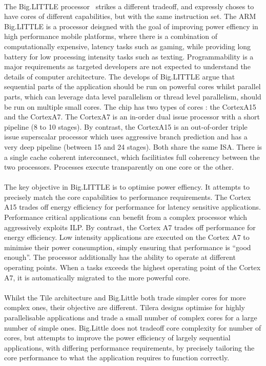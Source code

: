\paragraph{} The Big.LITTLE processor~\cite{greenhalgh2011biglittle} strikes 
a different tradeoff, and expressly choses to have cores of different capabilities, but
with the same instruction set. The ARM Big.LITTLE is a processor
deisgned with the goal of improving power effiency in high
performance mobile platforms, where there is a combination
of computationally expensive, latency tasks such as gaming, 
while providing long battery for low processing intensity tasks such
as texting. Programmability is a major requirements as targeted developers
are not expected to understand the details of computer architecture. 
The develops of Big.LITTLE argue that sequential parts of the application 
should be run on powerful cores whilst parallel parts, which can leverage data
level parallelism or thread level parallelism, should be run
on multiple small cores. The chip has two types of cores
: the CortexA15 and the CortexA7. The CortexA7 is an in-order dual issue
processor with a short pipeline (8 to 10 stages). By contrast,  the CortexA15
 is an out-of-order triple issue superscalar processor
which uses aggressive branch prediction and has a very deep pipeline
(between 15 and 24 stages). Both share the same ISA. There is a single cache
coherent interconnect, which facilitiates full coherency between the 
two processors. Processes execute transparently on one core or the other.

\paragraph{} The key objective in Big.LITTLE is to optimise power effiency. It attempts to 
precisely match the core capabilities to performance requirements. The Cortex A15 trades off energy
efficiency for performance for latency sensitive applications. Performance critical applications
can benefit from a complex processor which aggressively exploits ILP. 
By contrast, the Cortex A7 trades off performance for energy efficiency. Low 
intensity applications are executed on the Cortex A7 to minimise their power 
consumption, simply ensuring that performance is ``good enough''.  The processor
additionally has the ability to operate at different operating points. When a tasks
exceeds the highest operating point of the Cortex A7, it is automatically migrated
to the more powerful core. 

\paragraph{} Whilst the Tile architecture and Big.Little both trade  simpler cores for 
more complex ones, their objective are different. Tilera designs optimise
for highly parallelisable applications and trade a small number of 
complex cores for a large number of simple ones. Big.Little does not
tradeoff core complexity for number of cores, but attempts to improve
the power efficiency of largely sequential applications, with differing
performance requirements,  by precisely tailoring the core performance to what
the application requires to function correctly. 

